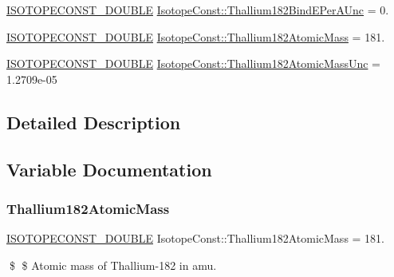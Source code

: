 \begin{DoxyCompactItemize}
\mbox{\hyperlink{group___isotope_const-_macros_ga8f45a7272ce02c0b4c65c44636ed719a}{I\+S\+O\+T\+O\+P\+E\+C\+O\+N\+S\+T\+\_\+\+D\+O\+U\+B\+LE}} \mbox{\hyperlink{group___isotope_const-_thallium-_tl182_gafdf8adea8fd8bbfc779bf981b6918a4e}{Isotope\+Const\+::\+Thallium182\+Bind\+E\+Per\+A\+Unc}} = 0.
\item 
\mbox{\hyperlink{group___isotope_const-_macros_ga8f45a7272ce02c0b4c65c44636ed719a}{I\+S\+O\+T\+O\+P\+E\+C\+O\+N\+S\+T\+\_\+\+D\+O\+U\+B\+LE}} \mbox{\hyperlink{group___isotope_const-_thallium-_tl182_ga2796d926ff51caf0c57285c184a446d3}{Isotope\+Const\+::\+Thallium182\+Atomic\+Mass}} = 181.
\item 
\mbox{\hyperlink{group___isotope_const-_macros_ga8f45a7272ce02c0b4c65c44636ed719a}{I\+S\+O\+T\+O\+P\+E\+C\+O\+N\+S\+T\+\_\+\+D\+O\+U\+B\+LE}} \mbox{\hyperlink{group___isotope_const-_thallium-_tl182_ga02a8279cb925e16dc7fd84c64d441914}{Isotope\+Const\+::\+Thallium182\+Atomic\+Mass\+Unc}} = 1.\+2709e-\/05
\end{DoxyCompactItemize}


\subsection{Detailed Description}


\subsection{Variable Documentation}
\mbox{\label{group___isotope_const-_thallium-_tl182_ga2796d926ff51caf0c57285c184a446d3}} 
\subsubsection{\texorpdfstring{Thallium182\+Atomic\+Mass}{Thallium182AtomicMass}}
{\footnotesize\ttfamily \mbox{\hyperlink{group___isotope_const-_macros_ga8f45a7272ce02c0b4c65c44636ed719a}{I\+S\+O\+T\+O\+P\+E\+C\+O\+N\+S\+T\+\_\+\+D\+O\+U\+B\+LE}} Isotope\+Const\+::\+Thallium182\+Atomic\+Mass = 181.}

\$ \$ Atomic mass of Thallium-\/182 in amu. \mbox{\label{group___isotope_const-_thallium-_tl182_ga02a8279cb925e16dc7fd84c64d441914}} 
